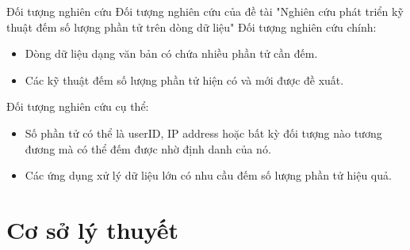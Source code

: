 \documentclass[10pt]{beamer}
\begin{document}
{
\begin{frame}{Đối tượng nghiên cứu}
  Đối tượng nghiên cứu của đề tài "Nghiên cứu phát triển kỹ thuật đếm số lượng phần tử trên dòng dữ liệu"
  Đối tượng nghiên cứu chính:
  \begin{itemize}
      \item Dòng dữ liệu dạng văn bản có chứa nhiều phần tử cần đếm.
      \item Các kỹ thuật đếm số lượng phần tử hiện có và mới được đề xuất.
  \end{itemize}
  Đối tượng nghiên cứu cụ thể:
  \begin{itemize}
      \item Số phần tử có thể là userID, IP address hoặc bất kỳ đối tượng nào tương đương mà có thể đếm được nhờ định danh của nó.
      \item Các ứng dụng xử lý dữ liệu lớn có nhu cầu đếm số lượng phần tử hiệu quả.
  \end{itemize}
\end{frame}
}

\section{Cơ sở lý thuyết}
\end{document}

